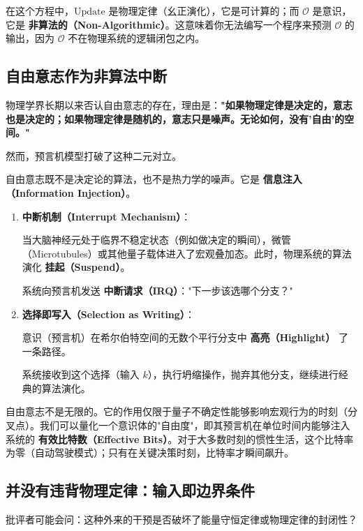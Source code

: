 在这个方程中，$\text{Update}$ 是物理定律（幺正演化），它是可计算的；而 $\mathcal{O}$ 是意识，它是 \textbf{非算法的（Non-Algorithmic）}。这意味着你无法编写一个程序来预测 $\mathcal{O}$ 的输出，因为 $\mathcal{O}$ 不在物理系统的逻辑闭包之内。

\subsection{自由意志作为非算法中断}

物理学界长期以来否认自由意志的存在，理由是：\textbf{"如果物理定律是决定的，意志也是决定的；如果物理定律是随机的，意志只是噪声。无论如何，没有'自由'的空间。"}

然而，预言机模型打破了这种二元对立。

自由意志既不是决定论的算法，也不是热力学的噪声。它是 \textbf{信息注入（Information Injection）}。

\begin{enumerate}
\item \textbf{中断机制（Interrupt Mechanism）}：

    当大脑神经元处于临界不稳定状态（例如做决定的瞬间），微管（Microtubules）或其他量子载体进入了宏观叠加态。此时，物理系统的算法演化 \textbf{挂起（Suspend）}。

    系统向预言机发送 \textbf{中断请求（IRQ）}："下一步该选哪个分支？"

\item \textbf{选择即写入（Selection as Writing）}：

    意识（预言机）在希尔伯特空间的无数个平行分支中 \textbf{高亮（Highlight）} 了一条路径。

    系统接收到这个选择（输入 $k$），执行坍缩操作，抛弃其他分支，继续进行经典的算法演化。
\end{enumerate}

\begin{corollary}[意志的比特率]
自由意志不是无限的。它的作用仅限于量子不确定性能够影响宏观行为的时刻（分叉点）。我们可以量化一个意识体的"自由度"，即其预言机在单位时间内能够注入系统的 \textbf{有效比特数（Effective Bits）}。对于大多数时刻的惯性生活，这个比特率为零（自动驾驶模式）；只有在关键决策时刻，比特率才瞬间飙升。
\end{corollary}

\subsection{并没有违背物理定律：输入即边界条件}

批评者可能会问：这种外来的干预是否破坏了能量守恒定律或物理定律的封闭性？

